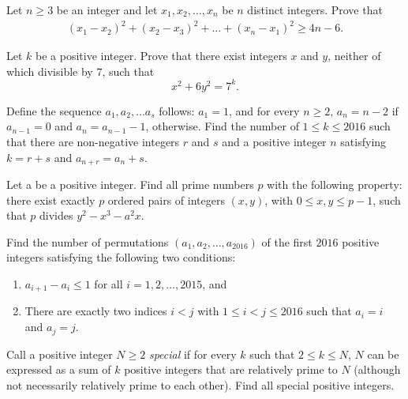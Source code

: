 \documentclass[problems.tex]{subfile}
\begin{document}
	
	
	\begin{problem}
		Let $n \geq 3$ be an integer and let $x_1, x_2,\dots , x_n$ be $n$ distinct integers. Prove that
		\begin{align*}
			(x_1 - x_2)^2 +(x_2 - x_3)^2 + \dots+(x_n - x_1)^2 \geq 4n - 6.
		\end{align*}
	\end{problem}
	
	
	\begin{problem}
		Let $k$ be a positive integer. Prove that there exist integers $x$ and $y$, neither of which divisible by $7$, such that $$x^2 + 6y^2 = 7^k.$$
	\end{problem}
	
	
	
	\begin{problem}
		Define the sequence $a_1, a_2,\dots a_s$ follows: $a_1 = 1$, and for every $n \geq 2$, $a_n = n - 2$ if $a_{n-1} = 0$ and $a_n = a_{n-1} - 1$, otherwise. Find the number of $1 \leq k \leq 2016$ such that there are non-negative integers $r$ and $s$ and a positive integer $n$ satisfying $k = r + s$ and $a_{n+r} = a_n + s.$
	\end{problem}
	
	
	\begin{problem}
		Let a be a positive integer. Find all prime numbers $p$ with the following property: there exist exactly $p$ ordered pairs of integers $(x, y)$, with $0 \leq x, y \leq p - 1$, such that $p$ divides $y^2 - x^3 - a^2x$.
	\end{problem}
	
	
	\begin{problem}
		Find the number of permutations $(a_1, a_2, \dots, a_{2016})$ of the first $2016$ positive integers satisfying the following two conditions:
		\begin{enumerate}
			\item $a_{i+1} - a_i \leq 1$ for all $i =1 , 2, \dots, 2015$, and
			\item There are exactly two indices $i < j$ with $1 \leq i < j \leq 2016$ such that $a_i = i$ and $a_j = j$.
		\end{enumerate}
	\end{problem}
	
	
	
	\begin{problem}
		Call a positive integer $N \geq 2$ \textit{special} if for every $k$ such that $2 \leq k \leq N$, $N$ can be expressed as a sum of $k$ positive integers that are relatively prime to $N$ (although not necessarily relatively prime to each other). Find all special positive integers.
	\end{problem}
	
\end{document}
